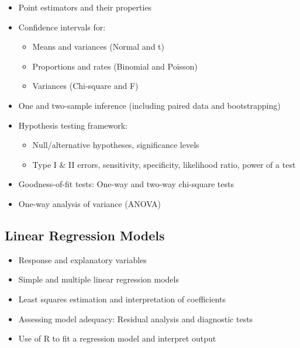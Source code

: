 \documentclass[
  a4paper,
  DIV=11,
  numbers=noendperiod,
  oneside]{scrreprt}
\providecommand{\tightlist}{%
  \setlength{\itemsep}{0pt}\setlength{\parskip}{0pt}}
\theoremstyle{plain}
\theoremstyle{definition}
\theoremstyle{definition}
\theoremstyle{definition}
\theoremstyle{plain}
\theoremstyle{remark}
\begin{document}
\begin{itemize}
\tightlist
\item
  Point estimators and their properties\\
\item
  Confidence intervals for:

  \begin{itemize}
  \tightlist
  \item
    Means and variances (Normal and t)\\
  \item
    Proportions and rates (Binomial and Poisson)\\
  \item
    Variances (Chi-square and F)\\
  \end{itemize}
\item
  One and two-sample inference (including paired data and
  bootstrapping)\\
\item
  Hypothesis testing framework:

  \begin{itemize}
  \tightlist
  \item
    Null/alternative hypotheses, significance levels\\
  \item
    Type I \& II errors, sensitivity, specificity, likelihood ratio,
    power of a test\\
  \end{itemize}
\item
  Goodness-of-fit tests: One-way and two-way chi-square tests\\
\item
  One-way analysis of variance (ANOVA)
\end{itemize}

\subsection*{Linear Regression Models}\label{linear-regression-models}

\begin{itemize}
\tightlist
\item
  Response and explanatory variables\\
\item
  Simple and multiple linear regression models\\
\item
  Least squares estimation and interpretation of coefficients\\
\item
  Assessing model adequacy: Residual analysis and diagnostic tests\\
\item
  Use of R to fit a regression model and interpret output
\end{itemize}
\end{document}
